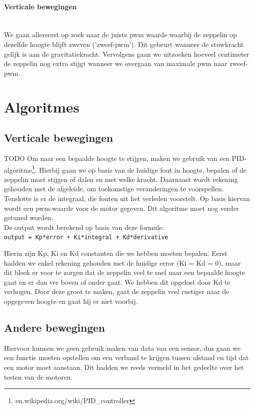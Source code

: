 \documentclass[eind]{penoverslag}
\begin{document}
\paragraph{Verticale bewegingen} ~\\ 
We gaan allereerst op zoek naar de juiste pwm waarde waarbij de zeppelin op dezelfde hoogte blijft zweven ('zweef-pwm').  Dit gebeurt wanneer de stuwkracht gelijk is aan de gravitatiekracht.  Vervolgens gaan we uitzoeken hoeveel centimeter de zeppelin nog extra stijgt wanneer we overgaan van maximale pwm naar zweef-pwm.\\



\section{Algoritmes}
\subsection{Verticale bewegingen}
TODO
Om naar een bepaalde hoogte te stijgen, maken we gebruik van een PID-algoritme\footnote{en.wikipedia.org/wiki/PID\_controller}. Hierbij gaan we op basis van de huidige fout in hoogte, bepalen of de zeppelin moet stijgen of dalen en met welke kracht. Daarnaast wordt rekening gehouden met de afgeleide, om toekomstige veranderingen te voorspellen. Tenslotte is er de integraal, die fouten uit het verleden voorstelt. Op basis hiervan wordt een pwm-waarde voor de motor gegeven. Dit algoritme moet nog verder getuned worden. \\
De output wordt berekend op basis van deze formule: \\
\texttt{output = Kp*error + Ki*integral + Kd*derivative}

Hierin zijn Kp, Ki en Kd constanten die we hebben moeten bepalen. Eerst hadden we enkel rekening gehouden met de huidige error (Ki = Kd = 0), maar dit bleek er voor te zorgen dat de zeppelin veel te snel naar een bepaalde hoogte gaat en er dan ver boven of onder gaat. We hebben dit opgelost door Kd te verhogen. Door deze groot te maken, gaat de zeppelin veel rustiger naar de opgegeven hoogte en gaat hij er niet voorbij. \\


\subsection{Andere bewegingen}
Hiervoor kunnen we geen gebruik maken van data van een sensor, dus gaan we een functie moeten opstellen om een verband te krijgen tussen afstand en tijd dat een motor moet aanstaan. Dit hadden we reeds vermeld in het gedeelte over het testen van de motoren. \\
\end{document}
